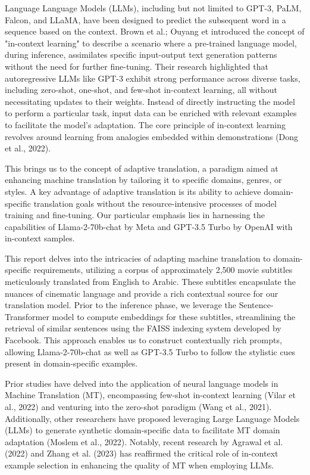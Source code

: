 \documentclass[twocolumn]{article}
\begin{document}
Language Language Models (LLMs), including but not limited to GPT-3\cite{brown2020language}, PaLM\cite{chowdhery2022palm}, Falcon\cite{penedo2023refinedweb}, and LLaMA\cite{touvron2023llama}, have been designed to predict the subsequent word in a sequence based on the context. Brown et al.\cite{brown2020language}; Ouyang et\cite{ouyang2022training} introduced the concept of "in-context learning" to describe a scenario where a pre-trained language model, during inference, assimilates specific input-output text generation patterns without the need for further fine-tuning. Their research highlighted that autoregressive LLMs like GPT-3 exhibit strong performance across diverse tasks, including zero-shot, one-shot, and few-shot in-context learning, all without necessitating updates to their weights. Instead of directly instructing the model to perform a particular task, input data can be enriched with relevant examples to facilitate the model's adaptation. The core principle of in-context learning revolves around learning from analogies embedded within demonstrations (Dong et al., 2022).


This brings us to the concept of adaptive translation, a paradigm aimed at enhancing machine translation by tailoring it to specific domains, genres, or styles. A key advantage of adaptive translation is its ability to achieve domain-specific translation goals without the resource-intensive processes of model training and fine-tuning. Our particular emphasis lies in harnessing the capabilities of Llama-2-70b-chat by Meta and GPT-3.5 Turbo by OpenAI with in-context samples.

This report delves into the intricacies of adapting machine translation to domain-specific requirements, utilizing a corpus of approximately 2,500 movie subtitles meticulously translated from English to Arabic. These subtitles encapsulate the nuances of cinematic language and provide a rich contextual source for our translation model. Prior to the inference phase, we leverage the Sentence-Transformer model to compute embeddings for these subtitles, streamlining the retrieval of similar sentences using the FAISS indexing system developed by Facebook. This approach enables us to construct contextually rich prompts, allowing Llama-2-70b-chat as well as GPT-3.5 Turbo to follow the stylistic cues present in domain-specific examples.

Prior studies have delved into the application of neural language models in Machine Translation (MT), encompassing few-shot in-context learning (Vilar et al., 2022) and venturing into the zero-shot paradigm (Wang et al., 2021). Additionally, other researchers have proposed leveraging Large Language Models (LLMs) to generate synthetic domain-specific data to facilitate MT domain adaptation (Moslem et al., 2022). Notably, recent research by Agrawal et al. (2022) and Zhang et al. (2023) has reaffirmed the critical role of in-context example selection in enhancing the quality of MT when employing LLMs.
\end{document}
